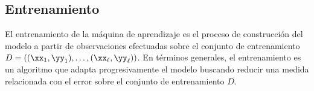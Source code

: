 %
%
\subsection{Entrenamiento}
%
El entrenamiento de la máquina de aprendizaje es el proceso de
construcción del modelo a partir de observaciones efectuadas 
sobre el conjunto de entrenamiento
$D=\left((\xx_1,\yy_1),\ldots,(\xx_\ell,\yy_\ell)\right)$.
En términos generales, el entrenamiento es un algoritmo que
adapta progresivamente el modelo buscando reducir una medida
relacionada con el error sobre el conjunto de entrenamiento $D$.

